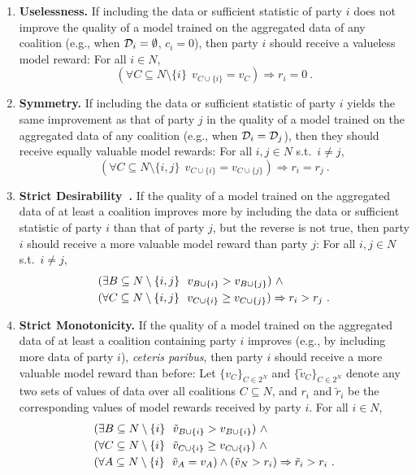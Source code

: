 \documentclass{article}
\theoremstyle{plain}
\theoremstyle{definition}
\theoremstyle{remark}
\begin{document}
 \begin{enumerate}[label=F\arabic*,leftmargin=*,itemsep=5pt,topsep=0pt,parsep=0pt,partopsep=0pt]
	\item\label{FAIR1} \textbf{Uselessness.}
	If including the data or sufficient statistic of party $i$ does not improve the quality of a model trained on the aggregated data of any coalition (e.g., when ${\mathcal{D}}_i = \emptyset$, $c_i = 0$), 
	then party $i$  should receive a valueless model reward: For all $i\in N$,
	\[(\forall C\subseteq N \setminus \{i\}\ \ v_{C \cup \{i\}} = v_C) \Rightarrow r_i = 0 \ .\]

	\item\label{FAIR2} \textbf{Symmetry.}
	If  %
	including the data or sufficient statistic of party $i$ 
	yields the same improvement as that of party $j$ in the quality of a model trained on the aggregated data of any coalition  (e.g., when ${\mathcal{D}}_i = {\mathcal{D}}_j$), then they should receive equally valuable model rewards: For all $i,j\in N$ s.t.~$i \neq j$,
	\[ (\forall C \subseteq N\setminus\{i,j\}\ \ v_{C \cup \{i\}} = v_{C \cup \{j\}}) \Rightarrow r_i = r_j \ .\]

    \item\label{FAIR3} \textbf{Strict Desirability~\cite{masc-kernel}.} 
    If the quality of a model trained on the aggregated data of at least a coalition improves more by including the data or sufficient statistic of party $i$ than that of party $j$, but the reverse is not true,
    then party $i$  should receive a more valuable model reward than party $j$: For all $i,j\in N$ s.t.~$i \neq j$,
	\[
	\begin{array}{l} 
	(\exists B \subseteq N\setminus\{i,j\}\ \ v_{B \cup \{i\}} > v_{B \cup \{j\}})\ \land \vspace{1mm}\\
     (\forall C \subseteq N\setminus\{i,j\}\ \ v_{C \cup \{i\}} \geq v_{C \cup \{j\}})	
	\Rightarrow r_i > r_j\  . 
	\end{array} 
	\]

 	\item\label{FAIR4} \textbf{Strict Monotonicity.}
	If the quality of a model trained on the aggregated data of at least a coalition containing party $i$ improves (e.g., by including more data of party $i$), \emph{ceteris paribus},
    then party $i$ should receive a more valuable model reward than before:  
	Let $\{v_C\}_{C \in 2^N}$ and $\{\tilde{v}_C\}_{C \in 2^N}$ denote any two sets of values of data over all coalitions $C\subseteq N$,
	and $r_i$ and $\tilde{r}_i$ be the corresponding values of model rewards received by party $i$. For all $i\in N$,
	\[
	\begin{array}{l} 
	(\exists B \subseteq  N\setminus\{i\}\ \ \tilde{v}_{B \cup \{i\}} > v_{B \cup \{i\}})
	\ \land \vspace{1mm}\\
	(\forall C \subseteq  N\setminus\{i\}\ \ \tilde{v}_{C \cup \{i\}} \geq v_{C \cup \{i\}})
	\ \land \vspace{1mm}\\
	(\forall A \subseteq  N\setminus\{i\}\ \ \tilde{v}_{A} = v_{A}) %
\land (\tilde{v}_N > r_i) \Rightarrow \tilde{r}_i > r_i\ . 
	\end{array} 
	\]
\end{enumerate}
\end{document}
